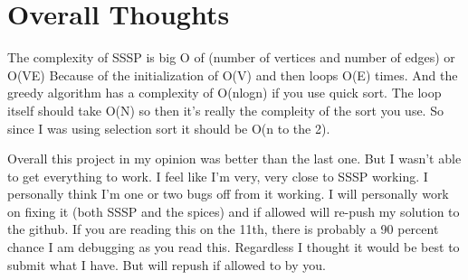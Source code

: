 \documentclass[letterpaper, 10pt]{article}
\begin{document}
\section{Overall Thoughts}
The complexity of SSSP is big O of (number of vertices and number of edges) or O(VE) Because of the initialization of O(V) and then loops O(E) times. And the greedy algorithm has a complexity of O(nlogn) if you use quick sort. The loop itself should take O(N) so then it's really the compleity of the sort you use. So since I was using selection sort it should be O(n to the 2).


Overall this project in my opinion was better than the last one. But I wasn't able to get everything to work. I feel like I'm very, very close to SSSP working. I personally think I'm one or two bugs off from it working. I will personally work on fixing it (both SSSP and the spices) and if allowed will re-push my solution to the github. If you are reading this on the 11th, there is probably a 90 percent chance I am debugging as you read this. Regardless I thought it would be best to submit what I have. But will repush if allowed to by you.
\end{document}
